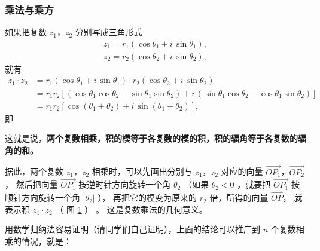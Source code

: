 \subsubsection{乘法与乘方}\label{subsec:5-7-1}

如果把复数 $z_1$，$z_2$ 分别写成三角形式
\begin{gather*}
    z_1 = r_1 (\cos\theta_1 + i\,\sin\theta_1), \\
    z_2 = r_2 (\cos\theta_2 + i\,\sin\theta_2),
\end{gather*}
就有
\begin{align*}
    z_1 \cdot z_2 &= r_1 (\cos\theta_1 + i\,\sin\theta_1) \cdot r_2 (\cos\theta_2 + i\,\sin\theta_2) \\
        &= r_1 r_2[(\cos\theta_1 \cos\theta_2 - \sin\theta_1 \sin\theta_2) + i\,(\sin\theta_1 \cos\theta_2 + \cos\theta_1 \sin\theta_2)] \\
        &= r_1 r_2[\cos(\theta_1 + \theta_2) + i\,\sin(\theta_1 + \theta_2)],
\end{align*}
即
\begin{center}
\end{center}

这就是说，\textbf{两个复数相乘，积的模等于各复数的模的积，积的辐角等于各复数的辐角的和。}

据此，两个复数 $z_1$，$z_2$ 相乘时，可以先画出分别与 $z_1$，$z_2$ 对应的向量
$\overrightarrow{OP_1}$，$\overrightarrow{OP_2}$， 然后把向量 $\overrightarrow{OP_1}$
按逆时针方向旋转一个角 $\theta_2$ （如果 $\theta_2 < 0$ ，就要把 $\overrightarrow{OP_1}$
按顺针方向旋转一个角 $|\theta_2|$ ）， 再把它的模变为原来的 $r_2$ 倍，所得的向量
$\overrightarrow{OP}$， 就表示积 $z_1 \cdot z_2$ （ 图 \ref{fig:5-10} ） 。
这是复数乘法的几何意义。

\begin{figure}[htbp]
    \centering
    
    \caption{}\label{fig:5-10}
\end{figure}


用数学归纳法容易证明（请同学们自己证明），上面的结论可以推广到 $n$ 个复数相乘的情况，就是：

